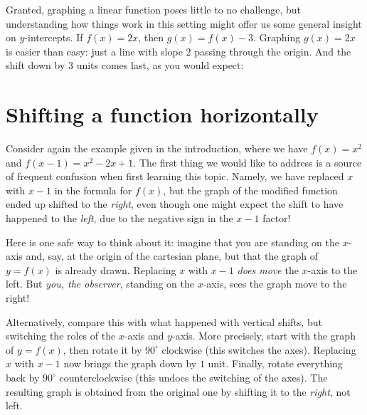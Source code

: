 \documentclass[handout, noauthor, nooutcomes]{ximera}
\begin{document}
\begin{example}
\begin{enumerate}[label=\alph*.]
\begin{explanation}
      Granted, graphing a linear function poses little to no challenge, but understanding how things work in this setting might offer us some general insight on $y$-intercepts. If $f(x) = 2x$, then $g(x) = f(x)-3$. Graphing $g(x) = 2x$ is easier than easy: just a line with slope $2$ passing through the origin. And the shift down by $3$ units comes last, as you would expect:
            \begin{image}
      \end{image}
    \end{explanation}
  \end{enumerate}
\end{example}


\section{Shifting a function horizontally}

Consider again the example given in the introduction, where we have $f(x) = x^2$ and $f(x-1) = x^2-2x+1$. The first thing we would like to address is a source of frequent confusion when first learning this topic. Namely, we have replaced $x$ with $x-1$ in the formula for $f(x)$, but the graph of the modified function ended up shifted to the \emph{right}, even though one might expect the shift to have happened to the \emph{left}, due to the negative sign in the $x-1$ factor!

Here is one safe way to think about it: imagine that you are standing on the $x$-axis and, say, at the origin of the cartesian plane, but that the graph of $y=f(x)$ is already drawn. Replacing $x$ with $x-1$ \emph{does move} the $x$-axis to the left. But \emph{you, the observer}, standing on the $x$-axis, sees the graph move to the right!

Alternatively, compare this with what happened with vertical shifts, but switching the roles of the $x$-axis and $y$-axis. More precisely, start with the graph of $y=f(x)$, then rotate it by $90^\circ$ clockwise (this switches the axes). Replacing $x$ with $x-1$ now brings the graph down by $1$ unit. Finally, rotate everything back by $90^\circ$ counterclockwise (this undoes the switching of the axes). The resulting graph is obtained from the original one by shifting it to the \emph{right}, not left. 
\end{document}
